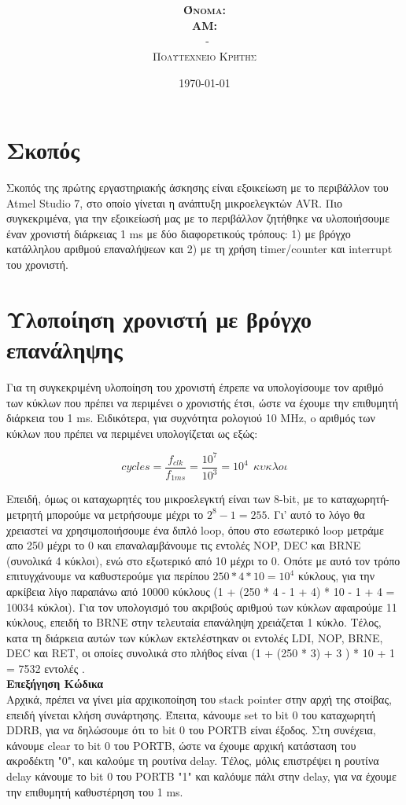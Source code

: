 \documentclass{article}
\title{\underline{\textbf{\assignmentNumber}}}
\author{\textsc{\textbf{Όνομα:}}  \studentName\\
		\textsc{\textbf{ΑΜ:}}  \studentNumber\\
		\course \ - \courseName\\ 
		\textsc{Πολυτεχνείο Κρήτης}
		}
\date{\today}
\begin{document}
	\maketitle

\section*{Σκοπός}
	Σκοπός της πρώτης εργαστηριακής άσκησης είναι εξοικείωση με το περιβάλλον του Atmel Studio 7, στο οποίο γίνεται η ανάπτυξη μικροελεγκτών AVR. Πιο συγκεκριμένα, για την εξοικείωσή μας με το περιβάλλον ζητήθηκε να υλοποιήσουμε έναν χρονιστή διάρκειας 1 ms με δύο διαφορετικούς τρόπους: 1) με βρόγχο κατάλληλου αριθμού επαναλήψεων και 2) με τη χρήση timer/counter και interrupt του χρονιστή.
	
\section*{Υλοποίηση χρονιστή με βρόγχο επανάληψης}	
	Για τη συγκεκριμένη υλοποίηση του χρονιστή έπρεπε να υπολογίσουμε τον αριθμό των κύκλων που πρέπει να περιμένει ο χρονιστής έτσι, ώστε να έχουμε την επιθυμητή διάρκεια του 1 ms.
	Eιδικότερα, για συχνότητα ρολογιού 10 ΜHz, o αριθμός των κύκλων που πρέπει να περιμένει υπολογίζεται ως εξώς:
	
	$$cycles = \frac{f_{clk}}{f_{1ms}} = \frac{10^{7}}{10^{3}} = 10^{4} \ \ κυκλοι$$
	
	\noindent
	Επειδή, όμως οι καταχωρητές του μικροελεγκτή είναι των 8-bit, με το καταχωρητή-μετρητή μπορούμε να μετρήσουμε μέχρι το $2^8 - 1 = 255$. Γι' αυτό το λόγο θα χρειαστεί να χρησιμοποιήσουμε ένα διπλό loop, όπου στο εσωτερικό loop μετράμε απο 250 μέχρι το 0 και επαναλαμβάνουμε τις εντολές NOP, DEC και BRNE (συνολικά 4 κύκλοι), ενώ στο εξωτερικό από 10 μέχρι το 0.
	Οπότε με αυτό τον τρόπο επιτυγχάνουμε να καθυστερούμε για περίπου $250*4*10 = 10^4$ κύκλους, για την αρκίβεια λίγο παραπάνω από 10000 κύκλους (1 + (250 * 4 - 1 + 4) * 10 - 1 + 4 = 10034 κύκλοι). Για τον υπολογισμό του ακριβούς αριθμού των κύκλων αφαιρούμε 11 κύκλους, επειδή το BRNE στην τελευταία επανάληψη χρειάζεται 1 κύκλο. Tέλος, κατα τη διάρκεια αυτών των κύκλων εκτελέστηκαν οι εντολές LDI, NOP, BRNE, DEC και RET, οι οποίες συνολικά στο πλήθος είναι (1 + (250 * 3) + 3 ) * 10 + 1 = 7532 εντολές . \\

	\noindent
	\textbf{Επεξήγηση Κώδικα} \\
	\noindent
	Αρχικά, πρέπει να γίνει μία αρχικοποίηση του stack pointer στην αρχή της στοίβας, επειδή γίνεται κλήση συνάρτησης. Έπειτα, κάνουμε set το bit 0 του καταχωρητή DDRB, για να δηλώσουμε ότι το bit 0 του PORTB είναι έξοδος. Στη συνέχεια, κάνουμε clear το bit 0 του PORTB, ώστε να έχουμε αρχική κατάσταση του ακροδέκτη "0", και καλούμε τη ρουτίνα delay. Τέλος, μόλις επιστρέψει η ρουτίνα delay κάνουμε το bit 0 του PORTB "1" και καλόυμε πάλι στην delay, για να έχουμε την επιθυμητή καθυστέρηση του 1 ms. \\
	
\end{document}
